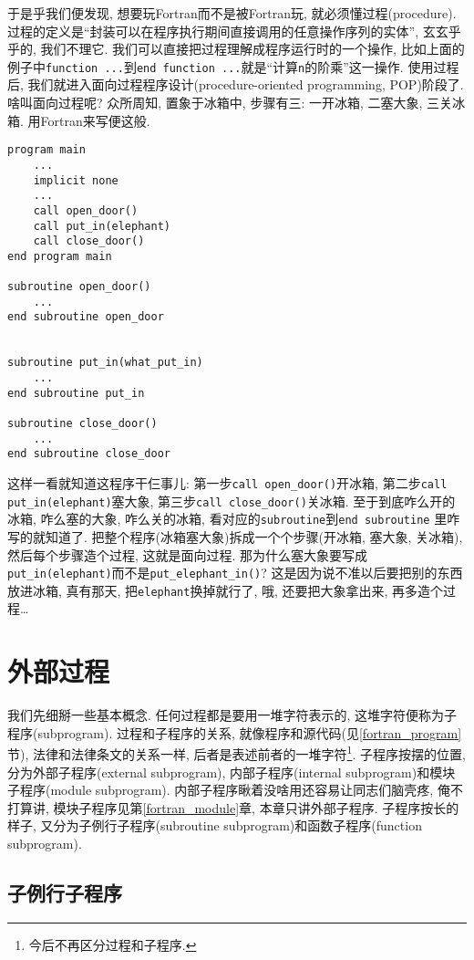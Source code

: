 于是乎我们便发现, 想要玩Fortran而不是被Fortran玩, 就必须懂过程(procedure). 过程的定义是``封装可以在程序执行期间直接调用的任意操作序列的实体'', 玄玄乎乎的, 我们不理它. 我们可以直接把过程理解成程序运行时的一个操作, 比如上面的例子中\texttt{function ...}到\texttt{end function ...}就是``计算\texttt{n}的阶乘''这一操作. 使用过程后, 我们就进入面向过程程序设计(procedure-oriented programming, POP)阶段了. 啥叫面向过程呢? 众所周知, 置象于冰箱中, 步骤有三: 一开冰箱, 二塞大象, 三关冰箱. 用Fortran来写便这般.
\begin{lstlisting}
program main
    ...
    implicit none
    ...
    call open_door()
    call put_in(elephant)
    call close_door()
end program main

subroutine open_door()
    ...
end subroutine open_door


subroutine put_in(what_put_in)
    ...
end subroutine put_in

subroutine close_door()
    ...
end subroutine close_door
\end{lstlisting}
这样一看就知道这程序干仨事儿: 第一步\texttt{call open\_{}door()}开冰箱, 第二步\texttt{call put\_{}in(elephant)}塞大象, 第三步\texttt{call close\_{}door()}关冰箱. 至于到底咋么开的冰箱, 咋么塞的大象, 咋么关的冰箱, 看对应的\texttt{subroutine}到\texttt{end subroutine}
里咋写的就知道了. 把整个程序(冰箱塞大象)拆成一个个步骤(开冰箱, 塞大象, 关冰箱), 然后每个步骤造个过程, 这就是面向过程. 那为什么塞大象要写成\texttt{put\_{}in(elephant)}而不是\texttt{put\_{}elephant\_{}in()}? 这是因为说不准以后要把别的东西放进冰箱, 真有那天, 把\texttt{elephant}换掉就行了, 哦, 还要把大象拿出来, 再多造个过程\dots

\section{外部过程}

我们先细掰一些基本概念. 任何过程都是要用一堆字符表示的, 这堆字符便称为子程序(subprogram). 过程和子程序的关系, 就像程序和源代码(见\ref{fortran_program}节), 法律和法律条文的关系一样, 后者是表述前者的一堆字符\footnote{今后不再区分过程和子程序.}. 子程序按摆的位置, 分为外部子程序(external subprogram), 内部子程序(internal subprogram)和模块子程序(module subprogram). 内部子程序瞅着没啥用还容易让同志们脑壳疼, 俺不打算讲, 模块子程序见第\ref{fortran_module}章, 本章只讲外部子程序. 子程序按长的样子, 又分为子例行子程序(subroutine subprogram)和函数子程序(function subprogram).

\subsection{子例行子程序}

